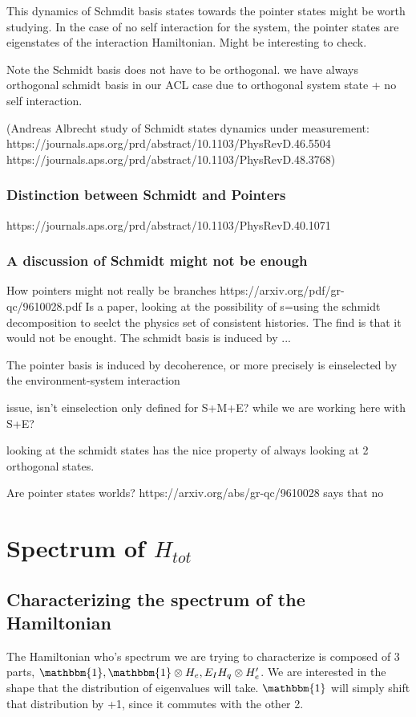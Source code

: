 \documentclass{article}
\begin{document}
This dynamics of Schmdit basis states towards the pointer states might be worth studying. In the case of no self interaction for the system, the pointer states are eigenstates of the interaction Hamiltonian. Might be interesting to check.

Note the Schmidt basis does not have to be orthogonal.  
we have always orthogonal schmidt basis in our ACL case due to orthogonal system state + no self interaction.

(Andreas Albrecht study of Schmidt states dynamics under measurement:
https://journals.aps.org/prd/abstract/10.1103/PhysRevD.46.5504
https://journals.aps.org/prd/abstract/10.1103/PhysRevD.48.3768)

\subsubsection{Distinction between Schmidt and Pointers}
https://journals.aps.org/prd/abstract/10.1103/PhysRevD.40.1071



\subsubsection{A discussion of Schmidt might not be enough}
How pointers might not really be branches https://arxiv.org/pdf/gr-qc/9610028.pdf
Is a paper, looking at the possibility of s=using the schmidt decomposition to seelct the physics set of consistent histories. The find is that it would not be enought.
The schmidt basis is induced by ...

The pointer basis is induced by decoherence, or more precisely is einselected by the environment-system interaction

issue, isn't einselection only defined for S+M+E? while we are working here with S+E?

looking at the schmidt states has the nice property of always looking at 2 orthogonal states.

Are pointer states worlds? https://arxiv.org/abs/gr-qc/9610028 says that no

\appendix

\section{Spectrum of $H_{tot}$}


\subsection{Characterizing the spectrum of the Hamiltonian}
The Hamiltonian who's spectrum we are trying to characterize is composed of 3 parts, $\mathbbm{1}, \mathbbm{1}\otimes H_e,E_IH_q\otimes H_e'$. We are interested in the shape that the distribution of eigenvalues will take. $\mathbbm{1}$ will simply shift that distribution by +1, since it commutes with the other 2. \\
\end{document}
